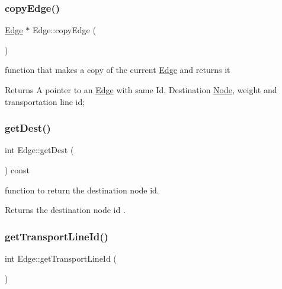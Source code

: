 \subsubsection{\texorpdfstring{copy\+Edge()}{copyEdge()}}
{\footnotesize\ttfamily \hyperlink{class_edge}{Edge} $\ast$ Edge\+::copy\+Edge (\begin{DoxyParamCaption}{ }\end{DoxyParamCaption})}



function that makes a copy of the current \hyperlink{class_edge}{Edge} and returns it 

\begin{DoxyReturn}{Returns}
A pointer to an \hyperlink{class_edge}{Edge} with same Id, Destination \hyperlink{class_node}{Node}, weight and transportation line id; 
\end{DoxyReturn}
\mbox{\label{class_edge_abaec2509b4b51681298960b180b06e25}} 
\subsubsection{\texorpdfstring{get\+Dest()}{getDest()}}
{\footnotesize\ttfamily int Edge\+::get\+Dest (\begin{DoxyParamCaption}{ }\end{DoxyParamCaption}) const}



function to return the destination node id. 

\begin{DoxyReturn}{Returns}
the destination node id . 
\end{DoxyReturn}
\mbox{\label{class_edge_ae7740d633ce6970776aa381cc54fbc18}} 
\subsubsection{\texorpdfstring{get\+Transport\+Line\+Id()}{getTransportLineId()}}
{\footnotesize\ttfamily int Edge\+::get\+Transport\+Line\+Id (\begin{DoxyParamCaption}{ }\end{DoxyParamCaption})}



